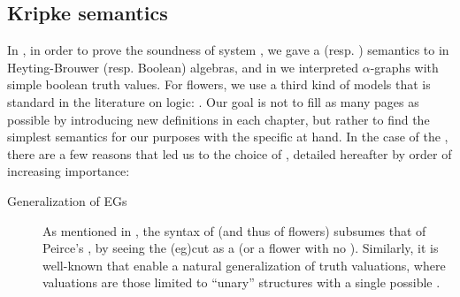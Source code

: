 \begin{scope}
\section{Kripke semantics}

In , in order to prove the soundness of system
, we gave a  (resp. ) semantics to  in
Heyting-Brouwer (resp. Boolean) algebras, and in  we
interpreted $\alpha$-graphs with simple boolean truth values. For flowers, we
use a third kind of models that is standard in the literature on 
logic: . Our goal is not to fill as many pages as possible by
introducing new definitions in each chapter, but rather to find the simplest
semantics for our purposes with the specific  at hand. In the case
of the , there are a few reasons that led us to the choice of
, detailed hereafter by order of increasing importance:
\begin{description}
  \item[Generalization of EGs]
    As mentioned in , the syntax of  
    (and thus of flowers) subsumes that of Peirce's  , by
    seeing the \kl(eg){cut} as a  (or a
    flower with no ). Similarly, it is well-known that 
    enable a natural generalization of truth valuations, where 
    valuations are those limited to ``unary'' structures with a single possible
    .
  

\end{description}
\end{scope}
